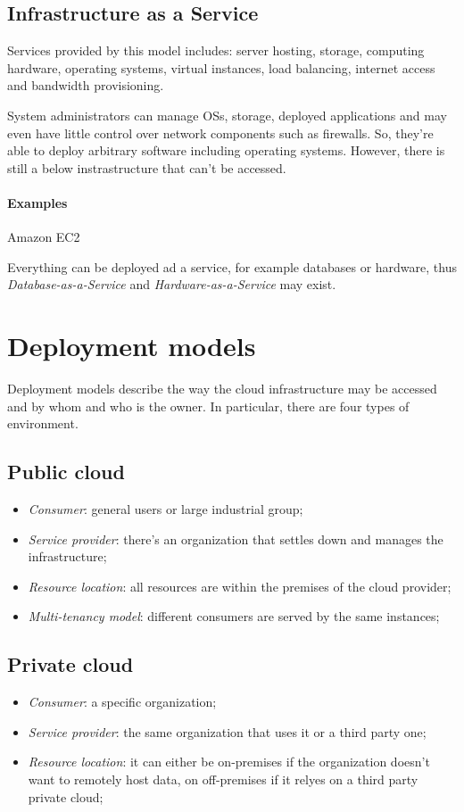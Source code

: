 \subsection{Infrastructure as a Service}
Services provided by this model includes: server hosting, storage, computing
hardware, operating systems, virtual instances, load balancing, internet access
and bandwidth provisioning.

System administrators can manage OSs, storage, deployed applications and may
even have little control over network components such as firewalls. So, they're
able to deploy arbitrary software including operating systems. However, there
is still a below instrastructure that can't be accessed.

\paragraph{Examples} Amazon EC2

\begin{note}
    Everything can be deployed ad a service, for example databases or hardware,
    thus \emph{Database-as-a-Service} and \emph{Hardware-as-a-Service} may
    exist.
\end{note}

\section{Deployment models}
Deployment models describe the way the cloud infrastructure may be accessed
and by whom and who is the owner. In particular, there are four types of
environment.

\subsection{Public cloud}
\begin{itemize}
    \item \emph{Consumer}: general users or large industrial group;
    \item \emph{Service provider}: there's an organization that settles down
    and manages the infrastructure;
    \item \emph{Resource location}: all resources are within the premises of the
    cloud provider;
    \item \emph{Multi-tenancy model}: different consumers are served by the same
    instances;
\end{itemize}

\subsection{Private cloud}
\begin{itemize}
    \item \emph{Consumer}: a specific organization;
    \item \emph{Service provider}: the same organization that uses it or a third
    party one;
    \item \emph{Resource location}: it can either be on-premises if the organization
    doesn't want to remotely host data, on off-premises if it relyes on a third
    party private cloud;
\end{itemize}

